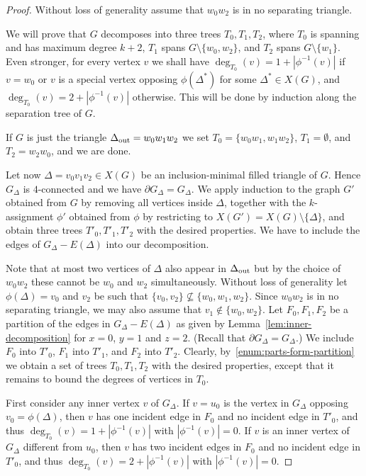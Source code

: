 \documentclass[a4paper,10pt]{article}
\theoremstyle{plain}
\renewcommand{\outer}[1]{\partial{#1}}
\begin{document}
\begin{proof}
 Without loss of generality assume that $w_0w_2$ is in no separating triangle.

 We will prove that $G$ decomposes into three trees $T_0, T_1, T_2$, where $T_0$ is spanning and has maximum degree $k+2$, $T_1$ spans $G\setminus\{w_0, w_2\}$, and $T_2$ spans $G\setminus\{w_1\}$.
 Even stronger, for every vertex $v$ we shall have $\deg_{T_0}(v) = 1 + |\phi^{-1}(v)|$ if $v = w_0$ or $v$ is a special vertex opposing $\phi(\Delta^*)$ for some $\Delta^* \in X(G)$, and $\deg_{T_0}(v) = 2 + |\phi^{-1}(v)|$ otherwise.
 This will be done by induction along the separation tree of $G$.
 
 If $G$ is just the triangle $\Delta_{\rm out} = w_0w_1w_2$ we set $T_0=\{w_0w_1,w_1w_2\}$, $T_1=\emptyset$, and $T_2=w_2w_0$, and we are done.
 
 Let now $\Delta= v_0v_1v_2 \in X(G)$ be an inclusion-minimal filled triangle of $G$.
 Hence $G_\Delta$ is $4$-connected and we have $\outer{G_\Delta} = G_\Delta$.
 We apply induction to the graph $G'$ obtained from $G$ by removing all vertices inside $\Delta$, together with the $k$-assignment $\phi'$ obtained from $\phi$ by restricting to $X(G') = X(G) \setminus \{\Delta\}$, and obtain three trees $T'_0,T'_1,T'_2$ with the desired properties. We have to include the edges of $G_\Delta - E(\Delta)$ into our decomposition. 
  
 
 Note that at most two vertices of $\Delta$ also appear in $\Delta_{\rm out}$ but by the choice of $w_0w_2$ these cannot be $w_0$ and $w_2$ simultaneously.
 Without loss of generality let $\phi(\Delta) = v_0$ and $v_2$ be such that $\{v_0,v_2\}\not\subseteq\{w_0,w_1,w_2\}$.
 Since $w_0w_2$ is in no separating triangle, we may also assume that $v_1 \notin \{w_0,w_2\}$.
 Let $F_0, F_1, F_2$ be a partition of the edges in $G_\Delta - E(\Delta)$ as given by Lemma~\ref{lem:inner-decomposition} for $x=0$, $y=1$ and $z=2$.
 (Recall that $\outer{G_\Delta} = G_\Delta$.)
 We include $F_0$ into $T'_0$, $F_1$ into $T'_1$, and $F_2$ into $T'_2$.
 Clearly, by~\ref{enum:parts-form-partition} we obtain a set of trees $T_0,T_1,T_2$ with the desired properties, except that it remains to bound the degrees of vertices in $T_0$. 

 First consider any inner vertex $v$ of $G_\Delta$.
 If $v = u_0$ is the vertex in $G_\Delta$ opposing $v_0 = \phi(\Delta)$, then $v$ has one incident edge in $F_0$ and no incident edge in $T'_0$, and thus $\deg_{T_0}(v) = 1 + |\phi^{-1}(v)|$ with $|\phi^{-1}(v)| = 0$.
 If $v$ is an inner vertex of $G_\Delta$ different from $u_0$, then $v$ has two incident edges in $F_0$ and no incident edge in $T'_0$, and thus $\deg_{T_0}(v) = 2 + |\phi^{-1}(v)|$ with $|\phi^{-1}(v)| = 0$.
 

\end{proof}
\end{document}
